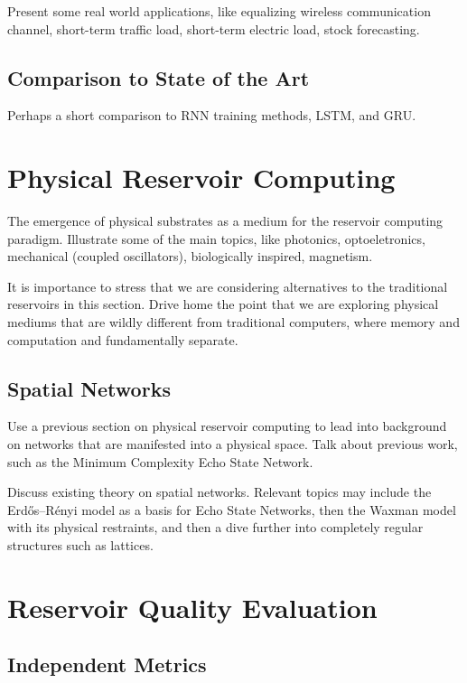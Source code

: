 Present some real world applications, like equalizing wireless communication
channel, short-term traffic load, short-term electric load, stock forecasting.

\subsection{Comparison to State of the Art}

Perhaps a short comparison to RNN training methods, LSTM, and GRU.

\section{Physical Reservoir Computing}

The emergence of physical substrates as a medium for the reservoir computing
paradigm. Illustrate some of the main topics, like photonics, optoeletronics,
mechanical (coupled oscillators), biologically inspired, magnetism.

It is importance to stress that we are considering alternatives to the
traditional reservoirs in this section. Drive home the point that we are
exploring physical mediums that are wildly different from traditional computers,
where memory and computation and fundamentally separate.


\subsection{Spatial Networks}

Use a previous section on physical reservoir computing to lead into background
on networks that are manifested into a physical space. Talk about previous work,
such as the Minimum Complexity Echo State Network.

Discuss existing theory on spatial networks. Relevant topics may include the
Erdős–Rényi model as a basis for Echo State Networks, then the Waxman model with
its physical restraints, and then a dive further into completely regular
structures such as lattices.

\section{Reservoir Quality Evaluation}

\subsection{Independent Metrics}

